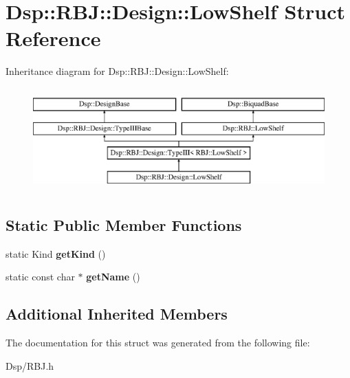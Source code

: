 \hypertarget{structDsp_1_1RBJ_1_1Design_1_1LowShelf}{\section{Dsp\-:\-:R\-B\-J\-:\-:Design\-:\-:Low\-Shelf Struct Reference}
\label{structDsp_1_1RBJ_1_1Design_1_1LowShelf}
}
Inheritance diagram for Dsp\-:\-:R\-B\-J\-:\-:Design\-:\-:Low\-Shelf\-:\begin{figure}[H]
\begin{center}
\leavevmode
\includegraphics[height=4.000000cm]{structDsp_1_1RBJ_1_1Design_1_1LowShelf}
\end{center}
\end{figure}
\subsection*{Static Public Member Functions}
\begin{DoxyCompactItemize}
\item 
\hypertarget{structDsp_1_1RBJ_1_1Design_1_1LowShelf_ae8ffd3e8f2b5cdb6ccfe87b7c32f3fcc}{static Kind {\bfseries get\-Kind} ()}\label{structDsp_1_1RBJ_1_1Design_1_1LowShelf_ae8ffd3e8f2b5cdb6ccfe87b7c32f3fcc}

\item 
\hypertarget{structDsp_1_1RBJ_1_1Design_1_1LowShelf_ae38c4e1ac5baa78b1dabbf6dfc0f9f80}{static const char $\ast$ {\bfseries get\-Name} ()}\label{structDsp_1_1RBJ_1_1Design_1_1LowShelf_ae38c4e1ac5baa78b1dabbf6dfc0f9f80}

\end{DoxyCompactItemize}
\subsection*{Additional Inherited Members}


The documentation for this struct was generated from the following file\-:\begin{DoxyCompactItemize}
\item 
Dsp/R\-B\-J.\-h\end{DoxyCompactItemize}
